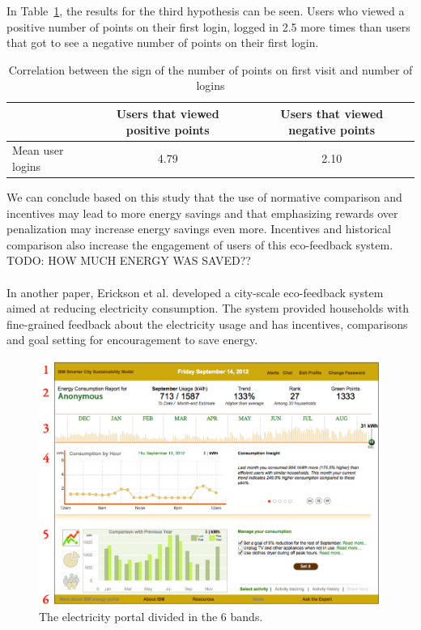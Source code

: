 \documentclass[journal]{vgtc}                %
\begin{document}
In Table~\ref{hypo3}, the results for the third hypothesis can be seen. Users who viewed a positive number of points on their first login, logged in 2.5 more times than users that got to see a negative number of points on their first login. \\

\begin{table}
  \caption{Correlation between the sign of the number of points on first visit and number of logins}
  \label{hypo3}
  \scriptsize
  \begin{center}
    \begin{tabular}{lcc}
    \multicolumn{1}{p{2cm}}{\centering } &
       \multicolumn{1}{p{2cm}}{\centering Users that viewed positive points} &
       \multicolumn{1}{p{2cm}}{\centering Users that viewed negative points} \\
    \hline
      Mean user logins &  4.79 & 2.10\\
    \end{tabular}
  \end{center}
\end{table}

We can conclude based on this study that the use of normative comparison and incentives may lead to more energy savings and that emphasizing rewards over penalization may increase energy savings even more. 
Incentives and historical comparison also increase the engagement of users of this eco-feedback system.\\
TODO: HOW MUCH ENERGY WAS SAVED??
\\~\\


In another paper, Erickson et al.\cite{erickson2013dubuque} developed a city-scale eco-feedback system aimed at reducing electricity consumption. The system provided households with fine-grained feedback about the electricity usage and has incentives, comparisons and goal setting for encouragement to save energy. \\

\begin{figure}[h]
	\centering
	\includegraphics[scale=0.26]{./electricity_portal.png}
	\caption{The electricity portal divided in the 6 bands.}
	\label{fig:electricityportal}
\end{figure}
\end{document}

